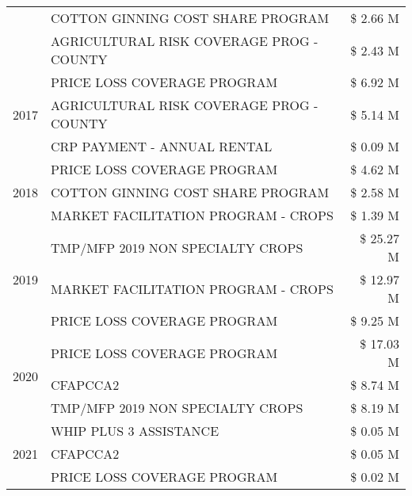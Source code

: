 \begin{tabular}{llr}
 & COTTON GINNING COST SHARE PROGRAM & \$ 2.66 M \\
 & AGRICULTURAL RISK COVERAGE PROG - COUNTY & \$ 2.43 M \\
\cline{1-3}
\multirow[t]{3}{*}{2017} & PRICE LOSS COVERAGE PROGRAM & \$ 6.92 M \\
 & AGRICULTURAL RISK COVERAGE PROG - COUNTY & \$ 5.14 M \\
 & CRP PAYMENT - ANNUAL RENTAL & \$ 0.09 M \\
\cline{1-3}
\multirow[t]{3}{*}{2018} & PRICE LOSS COVERAGE PROGRAM & \$ 4.62 M \\
 & COTTON GINNING COST SHARE PROGRAM & \$ 2.58 M \\
 & MARKET FACILITATION PROGRAM - CROPS & \$ 1.39 M \\
\cline{1-3}
\multirow[t]{3}{*}{2019} & TMP/MFP 2019 NON SPECIALTY CROPS & \$ 25.27 M \\
 & MARKET FACILITATION PROGRAM - CROPS & \$ 12.97 M \\
 & PRICE LOSS COVERAGE PROGRAM & \$ 9.25 M \\
\cline{1-3}
\multirow[t]{3}{*}{2020} & PRICE LOSS COVERAGE PROGRAM & \$ 17.03 M \\
 & CFAPCCA2 & \$ 8.74 M \\
 & TMP/MFP 2019 NON SPECIALTY CROPS & \$ 8.19 M \\
\cline{1-3}
\multirow[t]{3}{*}{2021} & WHIP PLUS 3 ASSISTANCE & \$ 0.05 M \\
 & CFAPCCA2 & \$ 0.05 M \\
 & PRICE LOSS COVERAGE PROGRAM & \$ 0.02 M \\
\cline{1-3}
\bottomrule
\end{tabular}
